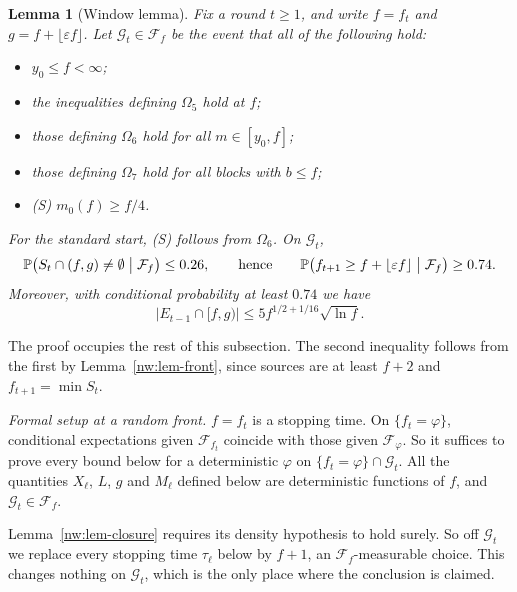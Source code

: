 \documentclass[11pt]{amsart}
\newtheorem{lemma}[theorem]{Lemma}
\theoremstyle{definition}
\theoremstyle{remark}
\newcommand{\eps}{\varepsilon}
\newcommand{\PP}{\mathbb{P}}
\newcommand{\cF}{\mathcal{F}}
\begin{document}
\begin{lemma}[Window lemma]\label{nw:lem-window}
Fix a round $t\ge1$, and write $f=f_t$ and $g=f+\lfloor\eps f\rfloor$. Let
$\mathcal G_t\in\cF_f$ be the event that all of the following hold:
\begin{itemize}[leftmargin=*]
\item $y_0\le f<\infty$;
\item the inequalities defining $\Omega_5$ hold at $f$;
\item those defining $\Omega_6$ hold for all $m\in[y_0,f]$;
\item those defining $\Omega_7$ hold for all blocks with $b\le f$;
\item \textup{(S)} $m_0(f)\ge f/4$.
\end{itemize}
For the standard start, \textup{(S)} follows from $\Omega_6$. On
$\mathcal G_t$,
\[
  \PP\bigl(S_t\cap(f,g)\ne\emptyset\bigm|\cF_f\bigr)\le0.26,\qquad\text{hence}
  \qquad\PP\bigl(f_{t+1}\ge f+\lfloor\eps f\rfloor\bigm|\cF_f\bigr)\ge0.74.
\]
Moreover, with conditional probability at least $0.74$ we have
\[
  |E_{t-1}\cap[f,g)|\le5f^{1/2+1/16}\sqrt{\ln f}.
\]
\end{lemma}

The proof occupies the rest of this subsection. The second inequality
follows from the first by Lemma~\ref{nw:lem-front}, since sources are at
least $f+2$ and $f_{t+1}=\min S_t$.

\emph{Formal setup at a random front.} $f=f_t$ is a stopping time. On
$\{f_t=\varphi\}$, conditional expectations given $\cF_{f_t}$ coincide with
those given $\cF_\varphi$. So it suffices to prove every bound below for a
deterministic $\varphi$ on $\{f_t=\varphi\}\cap\mathcal G_t$. All the
quantities $X_\ell$, $L$, $g$ and $M_\ell$ defined below are deterministic
functions of $f$, and $\mathcal G_t\in\cF_f$.

Lemma~\ref{nw:lem-closure} requires its density hypothesis to hold surely. So
off $\mathcal G_t$ we replace every stopping time $\tau_\ell$ below by $f+1$,
an $\cF_f$-measurable choice. This changes nothing on $\mathcal G_t$, which
is the only place where the conclusion is claimed.
\end{document}
